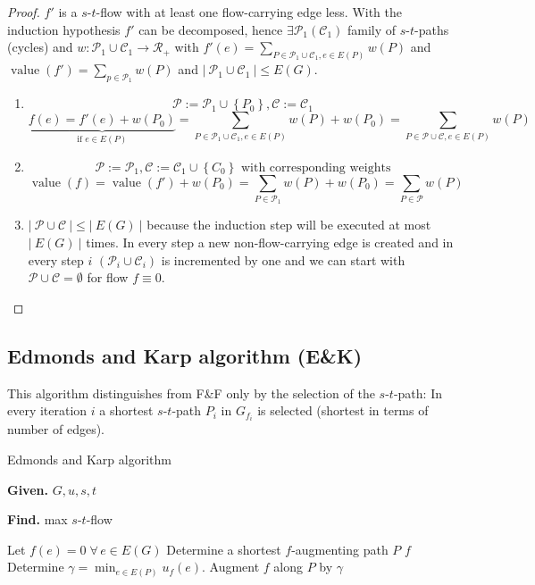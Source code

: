 \documentclass[a4paper]{article}
\theoremstyle{definition}
\newcommand{\card}[1]{\left|\:\!#1\:\!\right|}
\newcommand{\set}[1]{\left\{#1\right\}}
\newcommand{\given}[1]{\textbf{Given.} #1\par}
\newcommand{\find}[1]{\textbf{Find.} #1\par}
\newcommand{\gath}[2]{$#1$-$#2$-path} %
\newcommand{\flow}[2]{$#1$-$#2$-flow}
\newcommand{\fall}{\;\forall\,}
\begin{document}
\begin{proof}
  $f'$ is a \flow st with at least one flow-carrying edge less.
  With the induction hypothesis $f'$ can be decomposed, hence $\exists \mathcal{P}_1(\mathcal{C}_1)$ family of \gath sts (cycles) and $w: \mathcal{P}_1 \cup \mathcal{C}_1 \rightarrow \mathcal{R}_+$ with $f'(e) = \sum_{P \in \mathcal{P}_1 \cup \mathcal{C}_1, e \in E(P)} w(P)$ and $\operatorname{value}(f') = \sum_{p \in \mathcal{P}_1} w(P)$ and $\card{\mathcal{P}_1 \cup \mathcal{C}_1} \leq E(G)$.

  \begin{enumerate}
    \item
      \[
        \mathcal{P} := \mathcal{P}_1 \cup \set{P_0}, \mathcal{C} := \mathcal{C_1}
      \] \[
        \underbrace{f(e) = f'(e) + w(P_0)}_{\text{if } e \in E(P)}
          = \sum_{P \in \mathcal{P}_1 \cup \mathcal{C}_1, e \in E(P)} w(P) + w(P_0)
          = \sum_{P \in \mathcal{P} \cup \mathcal{C}, e \in E(P)} w(P)
      \]
    \item
      \[
        \mathcal{P} := \mathcal{P}_1, \mathcal{C}
          := \mathcal{C_1} \cup \set{C_0} \text{ with corresponding weights}
      \] \[
        \operatorname{value}(f) = \operatorname{value}(f') + w(P_0)
          = \sum_{P \in \mathcal{P}_1} w(P) + w(P_0)
          = \sum_{P \in \mathcal{P}} w(P)
      \]
    \item
      $\card{\mathcal{P} \cup \mathcal{C}} \leq \card{E(G)}$ because the induction step will be executed at most $\card{E(G)}$ times. In every step a new non-flow-carrying edge is created and in every step $i$ $(\mathcal{P}_i \cup \mathcal{C}_i)$ is incremented by one and we can start with $\mathcal{P} \cup \mathcal{C} = \emptyset$ for flow $f \equiv 0$.
  \end{enumerate}
\end{proof}

\subsection[Edmonds and Karp algorithm]{Edmonds and Karp algorithm (E\&K)}
\label{ch-4.3}
%
This algorithm distinguishes from F\&F only by the selection of the \gath st: In every iteration $i$ a shortest \gath st $P_i$ in $G_{f_i}$ is selected (shortest in terms of number of edges).

\begin{algorithm}
  \caption{Edmonds and Karp algorithm}
  \label{ek-algo}
  \given{$G, u, s, t$}
  \find{max \flow st}
\begin{algorithmic}[1]
  \State Let $f(e) = 0 \fall e \in E(G)$
  \State Determine a shortest $f$-augmenting path $P$
    \label{ek-step-redo}
    \State \Return $f$
  \EndIf
  \State
    Determine $\gamma = \min_{e \in E(P)} u_f(e)$.
    Augment $f$ along $P$ by $\gamma$
  \State {}
\end{algorithmic}
\end{algorithm}
\end{document}
